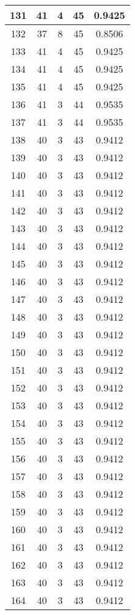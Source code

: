 \documentclass[letterpaper, 12pt]{article}
\begin{document}
\begin{longtable}{|c|c|c|c|c|}
\hline
131 & 41 & 4 & 45 & 0.9425 \\
\hline
132 & 37 & 8 & 45 & 0.8506 \\
\hline
133 & 41 & 4 & 45 & 0.9425 \\
\hline
134 & 41 & 4 & 45 & 0.9425 \\
\hline
135 & 41 & 4 & 45 & 0.9425 \\
\hline
136 & 41 & 3 & 44 & 0.9535 \\
\hline
137 & 41 & 3 & 44 & 0.9535 \\
\hline
138 & 40 & 3 & 43 & 0.9412 \\
\hline
139 & 40 & 3 & 43 & 0.9412 \\
\hline
140 & 40 & 3 & 43 & 0.9412 \\
\hline
141 & 40 & 3 & 43 & 0.9412 \\
\hline
142 & 40 & 3 & 43 & 0.9412 \\
\hline
143 & 40 & 3 & 43 & 0.9412 \\
\hline
144 & 40 & 3 & 43 & 0.9412 \\
\hline
145 & 40 & 3 & 43 & 0.9412 \\
\hline
146 & 40 & 3 & 43 & 0.9412 \\
\hline
147 & 40 & 3 & 43 & 0.9412 \\
\hline
148 & 40 & 3 & 43 & 0.9412 \\
\hline
149 & 40 & 3 & 43 & 0.9412 \\
\hline
150 & 40 & 3 & 43 & 0.9412 \\
\hline
151 & 40 & 3 & 43 & 0.9412 \\
\hline
152 & 40 & 3 & 43 & 0.9412 \\
\hline
153 & 40 & 3 & 43 & 0.9412 \\
\hline
154 & 40 & 3 & 43 & 0.9412 \\
\hline
155 & 40 & 3 & 43 & 0.9412 \\
\hline
156 & 40 & 3 & 43 & 0.9412 \\
\hline
157 & 40 & 3 & 43 & 0.9412 \\
\hline
158 & 40 & 3 & 43 & 0.9412 \\
\hline
159 & 40 & 3 & 43 & 0.9412 \\
\hline
160 & 40 & 3 & 43 & 0.9412 \\
\hline
161 & 40 & 3 & 43 & 0.9412 \\
\hline
162 & 40 & 3 & 43 & 0.9412 \\
\hline
163 & 40 & 3 & 43 & 0.9412 \\
\hline
164 & 40 & 3 & 43 & 0.9412 \\

\end{longtable}
\end{document}
